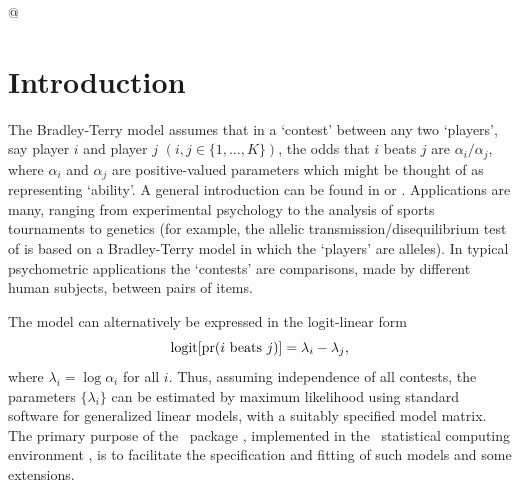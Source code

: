 


@

\Rcodeplaceholder{}


\section{Introduction}

The Bradley-Terry model \citep{brad:terr:52} assumes that in a `contest' between
any two `players', say player $i$ and player $j$ $(i, j \in \{1,\ldots,K\})$,
the odds that $i$ beats $j$ are $\alpha_i/\alpha_j$, where $\alpha_i$ and
$\alpha_j$ are positive-valued parameters which might be thought of as
representing `ability'.  A general introduction can be found in
\citet{brad:84} or \citet{agre:02}.
Applications are many, ranging from experimental psychology to the analysis of
sports tournaments to genetics (for example, the allelic
transmission/disequilibrium test of \citealp{sham:curt:95} is based on a
Bradley-Terry model in which the `players' are alleles).
In typical
psychometric applications the `contests' are comparisons, made by
different human subjects, between pairs of items.

The model can
alternatively be expressed in the logit-linear form
\begin{equation}
\logit[\pr(i\ \mathrm{beats}\ j)]=\lambda_i-\lambda_j,
\label{eq:unstructured}
\end{equation}
where $\lambda_i=\log\alpha_i$ for all $i$.  Thus, assuming independence of all
contests, the parameters $\{\lambda_i\}$ can be estimated by
maximum likelihood using standard software for generalized linear models, with a
suitably specified model matrix.  The primary purpose of the \BT\ package \citep{turn:12},
implemented in the \R\ statistical computing environment \citep{ihak:gent:96,
R}, is to facilitate the specification and fitting of such models and some
extensions.

